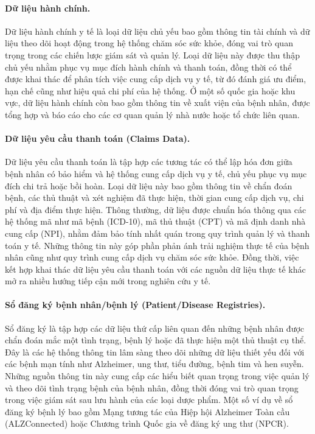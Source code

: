 \paragraph{Dữ liệu hành chính.}
Dữ liệu hành chính y tế là loại dữ liệu chủ yếu bao gồm thông tin tài chính và dữ liệu theo dõi hoạt động trong hệ thống chăm sóc sức khỏe, đóng vai trò quan trọng trong các chiến lược giám sát và quản lý. Loại dữ liệu này được thu thập chủ yếu nhằm phục vụ mục đích hành chính và thanh toán, đồng thời có thể được khai thác để phân tích việc cung cấp dịch vụ y tế, từ đó đánh giá ưu điểm, hạn chế cũng như hiệu quả chi phí của hệ thống. Ở một số quốc gia hoặc khu vực, dữ liệu hành chính còn bao gồm thông tin về xuất viện của bệnh nhân, được tổng hợp và báo cáo cho các cơ quan quản lý nhà nước hoặc tổ chức liên quan.
 
\paragraph{Dữ liệu yêu cầu thanh toán (Claims Data).}
Dữ liệu yêu cầu thanh toán là tập hợp các tương tác có thể lập hóa đơn giữa bệnh nhân có bảo hiểm và hệ thống cung cấp dịch vụ y tế, chủ yếu phục vụ mục đích chi trả hoặc bồi hoàn. Loại dữ liệu này bao gồm thông tin về chẩn đoán bệnh, các thủ thuật và xét nghiệm đã thực hiện, thời gian cung cấp dịch vụ, chi phí và địa điểm thực hiện. Thông thường, dữ liệu được chuẩn hóa thông qua các hệ thống mã như mã bệnh (ICD-10), mã thủ thuật (CPT) và mã định danh nhà cung cấp (NPI), nhằm đảm bảo tính nhất quán trong quy trình quản lý và thanh toán y tế. Những thông tin này góp phần phản ánh trải nghiệm thực tế của bệnh nhân cũng như quy trình cung cấp dịch vụ chăm sóc sức khỏe. Đồng thời, việc kết hợp khai thác dữ liệu yêu cầu thanh toán với các nguồn dữ liệu thực tế khác mở ra nhiều hướng tiếp cận mới trong nghiên cứu y tế.
 
\paragraph{Sổ đăng ký bệnh nhân/bệnh lý (Patient/Disease Registries).}
Sổ đăng ký là tập hợp các dữ liệu thứ cấp liên quan đến những bệnh nhân được chẩn đoán mắc một tình trạng, bệnh lý hoặc đã thực hiện một thủ thuật cụ thể. Đây là các hệ thống thông tin lâm sàng theo dõi những dữ liệu thiết yếu đối với các bệnh mạn tính như Alzheimer, ung thư, tiểu đường, bệnh tim và hen suyễn. Những nguồn thông tin này cung cấp các hiểu biết quan trọng trong việc quản lý và theo dõi tình trạng bệnh của bệnh nhân, đồng thời đóng vai trò quan trọng trong việc giám sát sau lưu hành của các loại dược phẩm. Một số ví dụ về sổ đăng ký bệnh lý bao gồm Mạng tương tác của Hiệp hội Alzheimer Toàn cầu (ALZConnected) hoặc Chương trình Quốc gia về đăng ký ung thư (NPCR).
 
